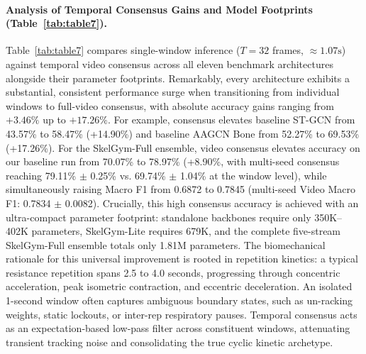 \documentclass[runningheads]{llncs}
\begin{document}
\paragraph{Analysis of Temporal Consensus Gains and Model Footprints (Table~\ref{tab:table7}).} Table~\ref{tab:table7} compares single-window inference ($T=32$ frames, $\approx 1.07\text{s}$) against temporal video consensus across all eleven benchmark architectures alongside their parameter footprints. Remarkably, every architecture exhibits a substantial, consistent performance surge when transitioning from individual windows to full-video consensus, with absolute accuracy gains ranging from $+3.46\%$ up to $+17.26\%$. For example, consensus elevates baseline ST-GCN from 43.57\% to 58.47\% (+14.90\%) and baseline AAGCN Bone from 52.27\% to 69.53\% (+17.26\%). For the SkelGym-Full ensemble, video consensus elevates accuracy on our baseline run from 70.07\% to 78.97\% (+8.90\%, with multi-seed consensus reaching 79.11\% $\pm$ 0.25\% vs. 69.74\% $\pm$ 1.04\% at the window level), while simultaneously raising Macro F1 from 0.6872 to 0.7845 (multi-seed Video Macro F1: 0.7834 $\pm$ 0.0082). Crucially, this high consensus accuracy is achieved with an ultra-compact parameter footprint: standalone backbones require only 350K--402K parameters, SkelGym-Lite requires 679K, and the complete five-stream SkelGym-Full ensemble totals only 1.81M parameters. The biomechanical rationale for this universal improvement is rooted in repetition kinetics: a typical resistance repetition spans 2.5 to 4.0 seconds, progressing through concentric acceleration, peak isometric contraction, and eccentric deceleration. An isolated 1-second window often captures ambiguous boundary states, such as un-racking weights, static lockouts, or inter-rep respiratory pauses. Temporal consensus acts as an expectation-based low-pass filter across constituent windows, attenuating transient tracking noise and consolidating the true cyclic kinetic archetype.
\end{document}
